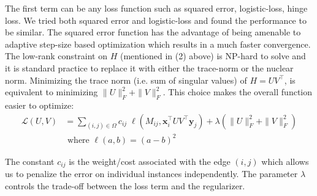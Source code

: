 \documentclass[runningheads,a4paper]{llncs}
\begin{document}
The first term can be any loss function such as squared error, logistic-loss, hinge loss. We tried both squared error and logistic-loss and found the performance to be similar. The squared error function has the advantage of being amenable to adaptive step-size based optimization which results in a much faster convergence. The low-rank constraint on $H$ (mentioned in (2) above) is NP-hard to solve and it is standard practice to replace it with either the trace-norm or the nuclear norm. Minimizing the trace norm (i.e. sum of singular values) of $H = UV^\intercal$, is equivalent to minimizing $\|U\|^2_F + \|V\|^2_F$. This choice makes the overall function easier to optimize:
\begin{equation}
\label{objective}
\begin{array}{ll}
\mathcal{L}(U,V) & =\displaystyle{\sum_{(i,j) \in \Omega}} c_{ij} \; \ell(M_{ij}, \mathbf{x}_i^\intercal U V^\intercal \mathbf{y}_j) + \lambda ( \|U\|^2_F + \|V\|^2_F ) \\
& \textrm{ where } \ell(a, b) = (a - b)^2
\end{array}
\end{equation}

The constant $c_{ij}$ is the weight/cost associated with the edge $(i,j)$ which allows us to penalize the error on individual instances independently. The parameter $\lambda$ controls the trade-off between the loss term and the regularizer. 


\end{document}

